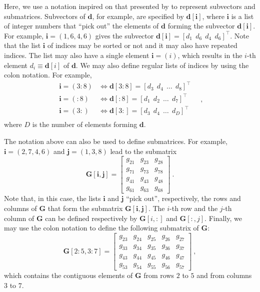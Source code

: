 Here, we use a notation inspired on that presented by \cite[][p. 4]{vanloan1992} to represent subvectors and submatrices.
Subvectors of $\mathbf{d}$, for example, are specified by $\mathbf{d}[\mathbf{i}]$, where $\mathbf{i}$ is a
list of integer numbers that ``pick out'' the elements of $\mathbf{d}$ forming the subvector $\mathbf{d}[\mathbf{i}]$.
For example, $\mathbf{i} = (1, 6, 4, 6)$ gives the subvector $\mathbf{d}[\mathbf{i}] = [ d_{1} \:\: d_{6} \:\: d_{4} \:\: d_{6} ]^{\top} $.
Note that the list $\mathbf{i}$ of indices may be sorted or not and it may also have repeated indices.
The list may also have a single element $\mathbf{i} = (i)$, which results in the $i$-th element $d_{i} \equiv \mathbf{d}[i]$ of $\mathbf{d}$.
We may also define regular lists of indices by using the colon notation. For example, 
\begin{equation*}
	\begin{split}
		\mathbf{i} = (3:8) &\Leftrightarrow \mathbf{d}[3:8] = [ d_{3} \:\: d_{4} \:\: \dots \:\: d_{8} ]^{\top} \\
		\mathbf{i} = (:8) &\Leftrightarrow \mathbf{d}[:8] = [ d_{1} \:\: d_{2} \:\: \dots \:\: d_{7} ]^{\top} \\
		\mathbf{i} = (3:) &\Leftrightarrow \mathbf{d}[3:] = [ d_{3} \:\: d_{4} \:\: \dots \:\: d_{D} ]^{\top} \\
	\end{split} \quad ,
\end{equation*}
where $D$ is the number of elements forming $\mathbf{d}$.

The notation above can also be used to define submatrices. For example, $\mathbf{i} = (2, 7, 4, 6)$ and $\mathbf{j} = (1, 3, 8)$
lead to the submatrix
\begin{equation*}
	\mathbf{G}[\mathbf{i}, \mathbf{j}] = \begin{bmatrix}
		g_{21} & g_{23} & g_{28} \\
		g_{71} & g_{73} & g_{78} \\
		g_{41} & g_{43} & g_{48} \\
		g_{61} & g_{63} & g_{68} 
	\end{bmatrix} \: .
\end{equation*}
Note that, in this case, the lists $\mathbf{i}$ and $\mathbf{j}$ ``pick out'', respectively, the rows and columns
of $\mathbf{G}$ that form the submatrix $\mathbf{G}[\mathbf{i}, \mathbf{j}]$.
The $i$-th row and the $j$-th column of $\mathbf{G}$ can be defined respectively by $\mathbf{G}[i,:]$ and $\mathbf{G}[:,j]$.
Finally, we may use the colon notation to define the following submatrix of $\mathbf{G}$:
\begin{equation*}
	\mathbf{G}[2:5,3:7] = \begin{bmatrix}
		g_{23} & g_{24} & g_{25} & g_{26} & g_{27} \\
		g_{33} & g_{34} & g_{35} & g_{36} & g_{37} \\
		g_{43} & g_{44} & g_{45} & g_{46} & g_{47} \\
		g_{53} & g_{54} & g_{55} & g_{56} & g_{57}
	\end{bmatrix} \: ,
\end{equation*}
which contains the contiguous elements of $\mathbf{G}$ from rows $2$ to $5$ and from columns
$3$ to $7$.

